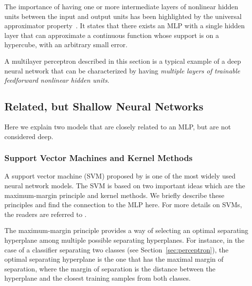 \documentclass{now}
\begin{document}
The importance of having one or more intermediate layers of nonlinear hidden
units between the input and output units has been highlighted by the universal
approximator property~\citep{Cybenko1989,Hornik1989}. It states that there
exists an MLP with a single hidden layer that can approximate a continuous
function whose support is on a hypercube, with an arbitrary small error.


A multilayer perceptron described in this section is a typical example of a deep
neural network that can be characterized by having \textit{multiple layers of
trainable feedforward nonlinear hidden units}. 

\subsection{Related, but Shallow Neural Networks}

Here we explain two models that are closely related to an MLP, but are not
considered deep.

\subsubsection{Support Vector Machines and Kernel Methods}
\label{sec:svm}

A support vector machine (SVM)
proposed by \citet{Cortes1995} is one of the most widely used neural network
models. The SVM is based on two important ideas which are the maximum-margin
principle and kernel methods.  We briefly describe these principles and find the
connection to the MLP here.  For more details on SVMs, the readers are referred
to \citep{Scholkopf2001}.

The maximum-margin principle provides a way of selecting an optimal separating
hyperplane among multiple possible separating hyperplanes.  For instance, in the
case of a classifier separating two classes (see Section~\ref{sec:perceptron}),
the optimal separating hyperplane is the one that has the maximal margin of
separation, where the margin of separation is the distance between the
hyperplane and the closest training samples from both classes.
\end{document}
